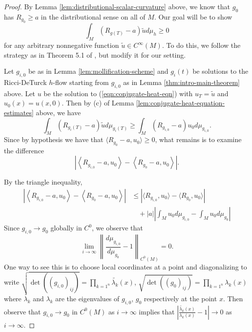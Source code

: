 \documentclass[12pt]{amsart}
\theoremstyle{remark}
\numberwithin{equation}{section}
\begin{document}
\begin{proof}
    By Lemma \ref{lem:distributional-scalar-curvature} above, we know that $g_0$ has $R_{g_0} \geq a$ in the distributional sense on all of $M$. Our goal will be to show
    \begin{equation*}
        \int_M (R_{g(T)}-a)\tilde{u}d\mu_h \geq 0
    \end{equation*}
    for any arbitrary nonnegative function $\tilde{u}\in C^\infty(M)$. To do this, we follow the strategy as in Theorem 5.1 of \cite{jiang_weak_2021}, but modify it for our setting. 
    
    Let $g_{i,0}$ be as in Lemma \ref{lem:mollification-scheme} and $g_i(t)$ be solutions to the Ricci-DeTurck $h$-flow starting from $g_{i,0}$ as in Lemma \ref{thm:intro-main-theorem} above. Let $u$ be the solution to (\ref{eqn:conjugate-heat-eqn}) with $u_T = \tilde{u}$ and $u_0(x) = u(x,0)$. Then by (c) of Lemma \ref{lem:conjugate-heat-equation-estimates} above, we have
    \begin{equation}\label{eqn:scalar-monotonicity}
        \int_M (R_{g_i(T)}-a)\tilde{u}d\mu_{g_i(T)} \geq \int_M (R_{g_{i,0}}-a)u_0d\mu_{g_{i,0}}.
    \end{equation}
    Since by hypothesis we have that $\langle R_{g_0} - a,u_0\rangle \geq 0$, what remains is to examine the difference
    \begin{equation*}
        \left|\left\langle R_{g_{i,0}}-a, u_0\right\rangle - \left\langle R_{g_0} - a, u_0\right\rangle \right|.
    \end{equation*}

    By the triangle inequality,
    \begin{align*}
        \left|\left\langle R_{g_{i,0}}-a, u_0\right\rangle - \left\langle R_{g_0} - a, u_0\right\rangle \right| &\leq \left|\langle R_{g_{i,0}},u_0\rangle - \langle R_{g_0}, u_0\rangle\right| \nonumber \\
        &\quad + |a|\left|\int_M u_0 d\mu_{g_{i,0}} - \int_M u_0 d\mu_{g_0}\right|
    \end{align*}
    Since $g_{i,0} \to g_0$ globally in $C^0$, we observe that 
    \begin{equation*}
        \lim\limits_{i\to\infty}\left\lVert \frac{d\mu_{g_{i,0}}}{d\mu_{g_0}} - 1\right\rVert_{C^0(M)} = 0.
    \end{equation*}
    One way to see this is to choose local coordinates at a point and diagonalizing to write  $\sqrt{\det((g_{i,0})_{ij})} = \prod\limits_{k=1^n}\tilde{\lambda_k}(x)$, $\sqrt{\det((g_{0})_{ij})} = \prod\limits_{k=1^n}\lambda_k(x)$ where $\tilde{\lambda_k}$ and $\lambda_k$ are the eigenvalues of $g_{i,0}$, $g_0$ respectively at the point $x$. Then observe that $g_{i,0} \to g_0$ in $C^0(M)$ as $i \to \infty$ implies that $\left|\frac{\tilde{\lambda_k}(x)}{\lambda_k(x)} - 1\right| \to 0$ as $i \to \infty$.


\end{proof}
\end{document}
